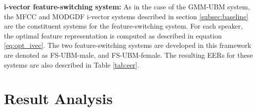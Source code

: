 \documentclass{article}
\begin{document}
\textbf{i-vector feature-switching system:}
As in the case of the GMM-UBM system, the MFCC and MODGDF i-vector systems
described in section \ref{subsec:baseline} are the constituent systems for the
feature-switching system. For each speaker, the optimal feature representation
is computed as described in equation \ref{eq:opt_ivec}.
The two feature-switching systems are developed in this
framework are denoted as FS-UBM-male, and FS-UBM-female. 
The resulting EERs for 
these systems are also described in Table \ref{tab:eer}.

\section{Result Analysis}
\label{subsec:resAnalysis}
\end{document}
